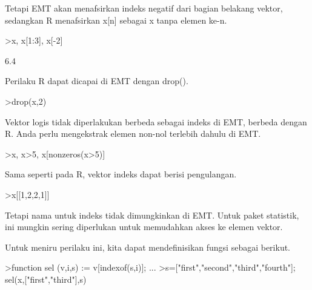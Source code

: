 \documentclass[a4paper,10pt]{article}
\begin{document}
\begin{eulernotebook}
\begin{eulercomment}
\begin{eulercomment}
\begin{eulercomment}
\begin{eulercomment}
\begin{eulercomment}
Tetapi EMT akan menafsirkan indeks negatif dari bagian belakang
vektor, sedangkan R menafsirkan x[n] sebagai x tanpa elemen ke-n.
\end{eulercomment}
\begin{eulerprompt}
>x, x[1:3], x[-2]
\end{eulerprompt}
\begin{euleroutput}
  [10.4,  5.6,  3.1,  6.4,  21.7]
  [10.4,  5.6,  3.1]
  6.4
\end{euleroutput}
\begin{eulercomment}
Perilaku R dapat dicapai di EMT dengan drop().
\end{eulercomment}
\begin{eulerprompt}
>drop(x,2)
\end{eulerprompt}
\begin{euleroutput}
  [10.4,  3.1,  6.4,  21.7]
\end{euleroutput}
\begin{eulercomment}
Vektor logis tidak diperlakukan berbeda sebagai indeks di EMT, berbeda
dengan R. Anda perlu mengekstrak elemen non-nol terlebih dahulu di
EMT.
\end{eulercomment}
\begin{eulerprompt}
>x, x>5, x[nonzeros(x>5)]
\end{eulerprompt}
\begin{euleroutput}
  [10.4,  5.6,  3.1,  6.4,  21.7]
  [1,  1,  0,  1,  1]
  [10.4,  5.6,  6.4,  21.7]
\end{euleroutput}
\begin{eulercomment}
Sama seperti pada R, vektor indeks dapat berisi pengulangan.
\end{eulercomment}
\begin{eulerprompt}
>x[[1,2,2,1]]
\end{eulerprompt}
\begin{euleroutput}
  [10.4,  5.6,  5.6,  10.4]
\end{euleroutput}
\begin{eulercomment}
Tetapi nama untuk indeks tidak dimungkinkan di EMT. Untuk paket
statistik, ini mungkin sering diperlukan untuk memudahkan akses ke
elemen vektor.

Untuk meniru perilaku ini, kita dapat mendefinisikan fungsi sebagai
berikut.
\end{eulercomment}
\begin{eulerprompt}
>function sel (v,i,s) := v[indexof(s,i)]; ...
>s=["first","second","third","fourth"]; sel(x,["first","third"],s)
\end{eulerprompt}
\begin{euleroutput}
  

\end{euleroutput}
\end{eulercomment}
\end{eulercomment}
\end{eulercomment}
\end{eulercomment}
\end{eulernotebook}
\end{document}
